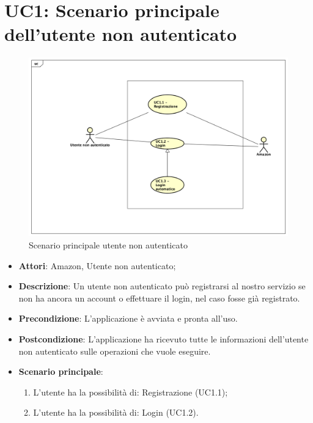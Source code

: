 \section{UC1: Scenario principale dell'utente non autenticato}
\label{UC1}
\begin{figure}[h]
	\centering
	\includegraphics[scale=0.4]{Diagram/UC1.png}
	\caption{Scenario principale utente non autenticato}\label{}
\end{figure}
\begin{itemize}
	\item \textbf{Attori}: Amazon, Utente non autenticato;
	\item \textbf{Descrizione}: Un utente non autenticato può registrarsi al nostro servizio se non ha ancora un account o effettuare il login, nel caso fosse già registrato.
	\item \textbf{Precondizione}: L'applicazione è avviata e pronta all'uso.
	\item \textbf{Postcondizione}: L'applicazione ha ricevuto tutte le informazioni dell'utente non autenticato sulle operazioni che vuole eseguire.
	\item \textbf{Scenario principale}:
	\begin{enumerate} \item L'utente ha la possibilità di: Registrazione (UC1.1);  \item 
		L'utente ha la possibilità di: Login (UC1.2).\end{enumerate}
\end{itemize}

